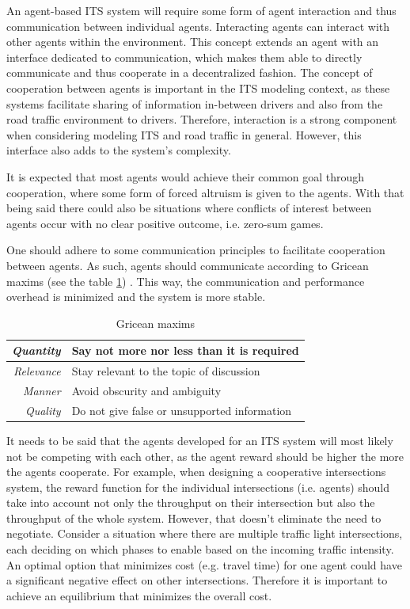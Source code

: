 \documentclass[0main.tex]{subfiles}
\begin{document}
An agent-based ITS system will require some form of agent interaction and
thus communication between individual agents. Interacting agents can interact with
other agents within the environment. This concept extends an agent with an interface dedicated
to communication, which makes them able to directly communicate and thus cooperate in a
decentralized fashion.  The concept of cooperation between agents is important in the ITS
modeling context, as these systems facilitate sharing of information in-between drivers and also
from the road traffic environment to drivers. Therefore, interaction is a strong component when
considering modeling ITS and road traffic in general. However, this interface also adds to the
system's complexity.

It is expected that most agents would achieve their common goal through cooperation, where some
form of forced altruism is given to the agents. With that being said there could also be
situations where conflicts of interest between agents occur with no clear positive outcome,
i.e. zero-sum games.

One should adhere to some communication principles to facilitate cooperation between agents. As
such, agents should communicate according to Gricean maxims (see the table \ref{maxims})
\cite{Shoham}. This way, the communication and performance overhead is minimized and the system 
is more stable. 


\begin{table}[htbp]
    \renewcommand{\arraystretch}{1.7}
    \setlength{\tabcolsep}{1em}
    \caption{Gricean maxims}
    \centering\begin{tabular}{>{\itshape}rl}
       \toprule
       Quantity & Say not more nor less than it is required \\ 
       \midrule
       Relevance &  Stay relevant to the topic of discussion \\
       \midrule
       Manner & Avoid obscurity and ambiguity \\ 
       \midrule
       Quality & Do not give false or unsupported information \\
       \bottomrule
    \end{tabular}
    \label{maxims}
\end{table}

It needs to be said that the agents developed for an ITS system will most likely not be
competing with each other, as the agent reward should be higher the more the agents cooperate.
For example, 
 when designing a cooperative intersections system, the reward function for the
individual intersections
(i.e. agents) should take into account not only the throughput on their intersection but also 
the throughput of the whole system. However, that doesn't eliminate the need to negotiate. Consider a 
situation where there are multiple traffic light intersections, each deciding on which phases to 
enable based on the incoming traffic intensity. An optimal option that minimizes cost (e.g. 
travel time) for one agent could have a significant negative effect on other intersections. 
Therefore it is important to achieve an equilibrium that minimizes the overall cost. 
\end{document}
